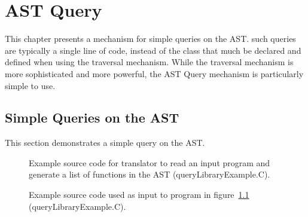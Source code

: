 \chapter{AST Query}

   This chapter presents a mechanism for simple queries on the AST.
such queries are typically a single line of code, instead of the 
class that much be declared and defined when using the traversal mechanism.
While the traversal mechanism is more sophisticated and more powerful, the AST Query
mechanism is particularly simple to use.

\section{Simple Queries on the AST}

   This section demonstrates a simple query on the AST.

\begin{figure}[!h]
{\indent
{\mySmallFontSize


\begin{latexonly}
   
\end{latexonly}

\begin{htmlonly}
   
\end{htmlonly}

}
}
\caption{Example source code for translator to read an input program and 
         generate a list of functions in the AST (queryLibraryExample.C).}
\label{Tutorial:exampleQueryLibrary}
\end{figure}

\begin{figure}[!h]
{\indent
{\mySmallFontSize


\begin{latexonly}
   
\end{latexonly}

\begin{htmlonly}
   
\end{htmlonly}

}
}
\caption{Example source code used as input to program in
    figure~\ref{Tutorial:exampleQueryLibrary} (queryLibraryExample.C).}
\label{Tutorial:exampleInputCode_QueryLibrary}
\end{figure}

